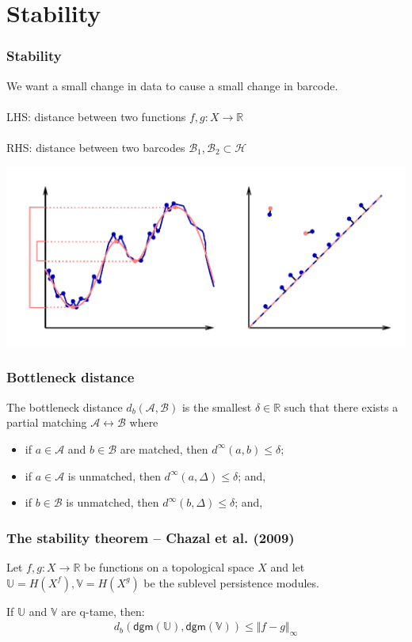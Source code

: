 \documentclass[11pt]{beamer}
\begin{document}
\section{Stability}
\begin{frame}
\frametitle{Stability}
We want a small change in data to cause a small change in barcode.\\~\\
\pause
LHS: distance between two functions $f, g : X \to \mathbb{R}$\\~\\
\pause
RHS: distance between two barcodes $\mathcal{B}_1, \mathcal{B}_2 \subset \mathcal{H}$
\end{frame}

\begin{frame}
\includegraphics[width=\textwidth,height=0.8\textheight,keepaspectratio]{bottleneck.png}
\end{frame}

\begin{frame}
\frametitle{Bottleneck distance}
\begin{definition}
The bottleneck distance $d_b(\mathcal{A}, \mathcal{B})$ is the smallest $\delta \in \mathbb{R}$ such that there exists a partial matching $\mathcal{A} \longleftrightarrow \mathcal{B}$ where
\begin{itemize}
\item if $a \in \mathcal{A}$ and $b \in \mathcal{B}$ are matched, then $d^\infty(a, b) \leq \delta$;
\item if $a \in \mathcal{A}$ is unmatched, then $d^\infty(a, \Delta) \leq \delta$; and,
\item if $b \in \mathcal{B}$ is unmatched, then $d^\infty(b, \Delta) \leq \delta$; and,
\end{itemize}
\end{definition}
\end{frame}


\begin{frame}
\frametitle{The stability theorem -- Chazal et al. (2009)}

\begin{theorem}
Let $f, g : X \to \mathbb{R}$ be functions on a topological space $X$ and let $\mathbb{U} = H(X^f), \mathbb{V} = H(X^g)$ be the sublevel persistence modules.

If $\mathbb{U}$ and $\mathbb{V}$ are q-tame, then:
\begin{align*}
d_b(\mathsf{dgm}(\mathbb{U}), \mathsf{dgm}(\mathbb{V})) \leq \Vert f - g \Vert_\infty
\end{align*}
\end{theorem}
\end{frame}

\begin{frame}
\nocite{*}
\printbibliography
\end{frame}
\end{document}
